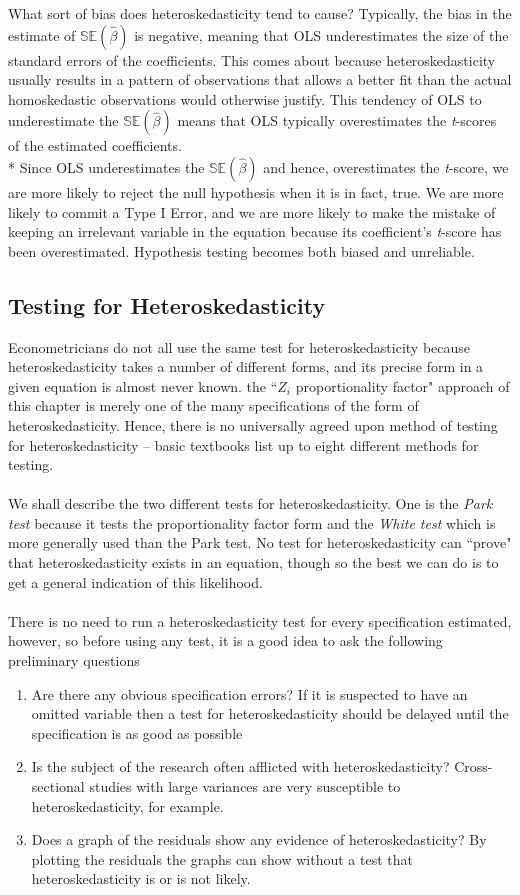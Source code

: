 \documentclass[11pt]{article}
\begin{document}
\begin{enumerate}
What sort of bias does heteroskedasticity tend to cause? Typically, the bias in the estimate of $\mathbb{SE}(\hat{\beta})$ is negative, meaning that OLS underestimates the size of the standard errors of the coefficients. This comes about because heteroskedasticity usually results in a pattern of observations that allows a better fit than the actual homoskedastic observations would otherwise justify. This tendency of OLS to underestimate the $\mathbb{SE}(\hat{\beta})$ means that OLS typically overestimates the \textit{t}-scores of the estimated coefficients.\\*
Since OLS underestimates the $\mathbb{SE}(\hat{\beta}) $ and hence, overestimates the \textit{t}-score, we are more likely to reject the null hypothesis when it is in fact, true. We are more likely to commit a Type I Error, and we are more likely to make the mistake of keeping an irrelevant variable in the equation because its coefficient's \textit{t}-score has been overestimated. Hypothesis testing becomes both biased and unreliable.
\end{enumerate}
\subsection{Testing for Heteroskedasticity}
Econometricians do not all use the same test for heteroskedasticity because heteroskedasticity takes a number of different forms, and its precise form in a given equation is almost never known. the ``$Z_i$ proportionality factor" approach of this chapter is merely one of the many specifications of the form of heteroskedasticity. Hence, there is no universally agreed upon method of testing for heteroskedasticity -- basic textbooks list up to eight different methods for testing.\\ \\
We shall describe the two different tests for heteroskedasticity. One is the \textit{Park test} because it tests the proportionality factor form and the \textit{White test} which is more generally used than the Park test. No test for heteroskedasticity can ``prove" that heteroskedasticity exists in an equation, though so the best we can do is to get a general indication of this likelihood.\\ \\
There is no need to run a heteroskedasticity test for every specification estimated, however, so before using any test, it is a good idea to ask the following preliminary questions
\begin{enumerate}
\item Are there any obvious specification errors? If it is suspected to have an omitted variable then a test for heteroskedasticity should be delayed until the specification is as good as possible
\item Is the subject of the research often afflicted with heteroskedasticity? Cross-sectional studies with large variances are very susceptible to heteroskedasticity, for example.
\item Does a graph of the residuals show any evidence of heteroskedasticity? By plotting the residuals the graphs can show without a test that heteroskedasticity is or is not likely. 
\end{enumerate}
\end{document}
